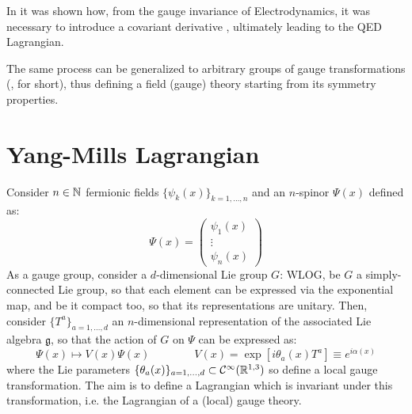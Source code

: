 
In  it was shown how, from the gauge invariance  of Electrodynamics, it was necessary to introduce a covariant derivative , ultimately leading to the QED Lagrangian.

The same process can be generalized to arbitrary groups of gauge transformations (, for short), thus defining a field (gauge) theory starting from its symmetry properties.

\section{Yang-Mills Lagrangian}

Consider $ n \in \mathbb{N} $ fermionic fields $ \{\psi_k(x)\}_{k = 1, \dots, n} $ and an $ n $-spinor $ \Psi(x) $ defined as:
\begin{equation}
  \Psi(x) =
  \begin{pmatrix}
    \psi_1(x) \\ \vdots \\ \psi_n(x)
  \end{pmatrix}
\end{equation}
As a gauge group, consider a $ d $-dimensional Lie group $ G $: WLOG, be $ G $ a simply-connected Lie group, so that each element can be expressed via the exponential map, and be it compact too, so that its representations are unitary. Then, consider $ \{T^a\}_{a = 1, \dots, d} $ an $ n $-dimensional representation of the associated Lie algebra $ \mathfrak{g} $, so that the action of $ G $ on $ \Psi $ can be expressed as:
\begin{equation}
  \Psi(x) \mapsto V(x) \Psi(x)
  \qquad \qquad
  V(x) = \exp \left[ i \theta_a(x) T^a \right] \equiv e^{i \alpha(x)}
  \label{eq:gauge-trans}
\end{equation}
where the Lie parameters $ \{\theta_a(x)\}_{a = 1, \dots, d} \subset \mathcal{C}^\infty(\mathbb{R}^{1,3}) $ so define a local gauge transformation. The aim is to define a Lagrangian which is invariant under this transformation, i.e. the Lagrangian of a (local) gauge theory.

